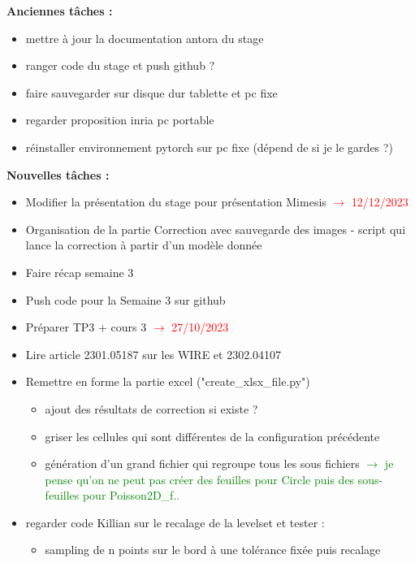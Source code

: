 \textbf{Anciennes tâches :}

\begin{itemize}[label=$\square$]
	\item mettre à jour la documentation antora du stage
	\item ranger code du stage et push github ?
	\item faire sauvegarder sur disque dur tablette et pc fixe
	\item regarder proposition inria pc portable
	\item réinstaller environnement pytorch sur pc fixe (dépend de si je le gardes ?)
\end{itemize}

\textbf{Nouvelles tâches :}

\begin{itemize}[label=$\square$]
	\item Modifier la présentation du stage pour présentation Mimesis \textcolor{red}{$\rightarrow$ 12/12/2023}
	\item[\done] Organisation de la partie Correction avec sauvegarde des images - script qui lance la correction à partir d'un modèle donnée
	\item[\done] Faire récap semaine 3
	\item[\done] Push code pour la Semaine 3 sur github
	\item[\done] Préparer TP3 + cours 3 \textcolor{red}{$\rightarrow$ 27/10/2023}
	\item Lire article 2301.05187 sur les WIRE et 2302.04107
	\item[\done] Remettre en forme la partie excel ("create\_xlsx\_file.py")
	\begin{itemize}[label=\LARGE $\circ$]
		\item[\sdone] ajout des résultats de correction si existe ?
		\item[\sdone] griser les cellules qui sont différentes de la configuration précédente
		\item[\swontfix] génération d'un grand fichier qui regroupe tous les sous fichiers \textcolor{Green}{$\rightarrow$ je pense qu'on ne peut pas créer des feuilles pour Circle puis des sous-feuilles pour Poisson2D\_f..}		
	\end{itemize}
	\item regarder code Killian sur le recalage de la levelset et tester :
	\begin{itemize}[label=\LARGE $\circ$]
		\item sampling de n points sur le bord à une tolérance fixée puis recalage

\end{itemize}
\end{itemize}
